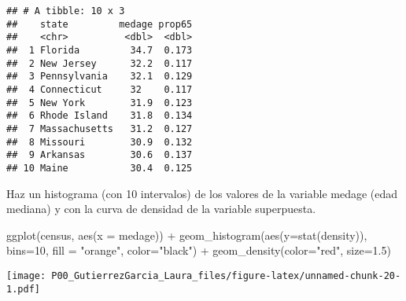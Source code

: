 \documentclass[
]{article}
\newenvironment{Shaded}{\begin{snugshade}}{\end{snugshade}}
\newcommand{\AttributeTok}[1]{\textcolor[rgb]{0.77,0.63,0.00}{#1}}
\newcommand{\DecValTok}[1]{\textcolor[rgb]{0.00,0.00,0.81}{#1}}
\newcommand{\FloatTok}[1]{\textcolor[rgb]{0.00,0.00,0.81}{#1}}
\newcommand{\FunctionTok}[1]{\textcolor[rgb]{0.00,0.00,0.00}{#1}}
\newcommand{\NormalTok}[1]{#1}
\newcommand{\SpecialCharTok}[1]{\textcolor[rgb]{0.00,0.00,0.00}{#1}}
\newcommand{\StringTok}[1]{\textcolor[rgb]{0.31,0.60,0.02}{#1}}
\begin{document}
\begin{verbatim}
## # A tibble: 10 x 3
##    state         medage prop65
##    <chr>          <dbl>  <dbl>
##  1 Florida         34.7  0.173
##  2 New Jersey      32.2  0.117
##  3 Pennsylvania    32.1  0.129
##  4 Connecticut     32    0.117
##  5 New York        31.9  0.123
##  6 Rhode Island    31.8  0.134
##  7 Massachusetts   31.2  0.127
##  8 Missouri        30.9  0.132
##  9 Arkansas        30.6  0.137
## 10 Maine           30.4  0.125
\end{verbatim}

Haz un histograma (con 10 intervalos) de los valores de la variable
medage (edad mediana) y con la curva de densidad de la variable
superpuesta.

\begin{Shaded}
\begin{Highlighting}[]
\FunctionTok{ggplot}\NormalTok{(census, }\FunctionTok{aes}\NormalTok{(}\AttributeTok{x =}\NormalTok{ medage)) }\SpecialCharTok{+} 
  \FunctionTok{geom\_histogram}\NormalTok{(}\FunctionTok{aes}\NormalTok{(}\AttributeTok{y=}\FunctionTok{stat}\NormalTok{(density)), }
                 \AttributeTok{bins=}\DecValTok{10}\NormalTok{, }\AttributeTok{fill =} \StringTok{"orange"}\NormalTok{, }\AttributeTok{color=}\StringTok{"black"}\NormalTok{)  }\SpecialCharTok{+} 
  \FunctionTok{geom\_density}\NormalTok{(}\AttributeTok{color=}\StringTok{"red"}\NormalTok{, }\AttributeTok{size=}\FloatTok{1.5}\NormalTok{)}
\end{Highlighting}
\end{Shaded}

\texttt{[image: P00\_GutierrezGarcia\_Laura\_files/figure-latex/unnamed-chunk-20-1.pdf]}
\end{document}
